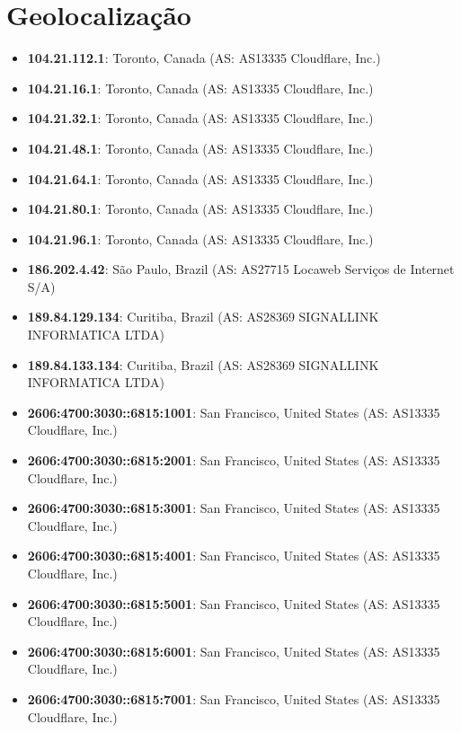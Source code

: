 
\section{Geolocalização}
\begin{itemize}
\item \textbf{104.21.112.1}: Toronto, Canada (AS: AS13335 Cloudflare, Inc.)\item \textbf{104.21.16.1}: Toronto, Canada (AS: AS13335 Cloudflare, Inc.)\item \textbf{104.21.32.1}: Toronto, Canada (AS: AS13335 Cloudflare, Inc.)\item \textbf{104.21.48.1}: Toronto, Canada (AS: AS13335 Cloudflare, Inc.)\item \textbf{104.21.64.1}: Toronto, Canada (AS: AS13335 Cloudflare, Inc.)\item \textbf{104.21.80.1}: Toronto, Canada (AS: AS13335 Cloudflare, Inc.)\item \textbf{104.21.96.1}: Toronto, Canada (AS: AS13335 Cloudflare, Inc.)\item \textbf{186.202.4.42}: São Paulo, Brazil (AS: AS27715 Locaweb Serviços de Internet S/A)\item \textbf{189.84.129.134}: Curitiba, Brazil (AS: AS28369 SIGNALLINK INFORMATICA LTDA)\item \textbf{189.84.133.134}: Curitiba, Brazil (AS: AS28369 SIGNALLINK INFORMATICA LTDA)\item \textbf{2606:4700:3030::6815:1001}: San Francisco, United States (AS: AS13335 Cloudflare, Inc.)\item \textbf{2606:4700:3030::6815:2001}: San Francisco, United States (AS: AS13335 Cloudflare, Inc.)\item \textbf{2606:4700:3030::6815:3001}: San Francisco, United States (AS: AS13335 Cloudflare, Inc.)\item \textbf{2606:4700:3030::6815:4001}: San Francisco, United States (AS: AS13335 Cloudflare, Inc.)\item \textbf{2606:4700:3030::6815:5001}: San Francisco, United States (AS: AS13335 Cloudflare, Inc.)\item \textbf{2606:4700:3030::6815:6001}: San Francisco, United States (AS: AS13335 Cloudflare, Inc.)\item \textbf{2606:4700:3030::6815:7001}: San Francisco, United States (AS: AS13335 Cloudflare, Inc.)
\end{itemize}
